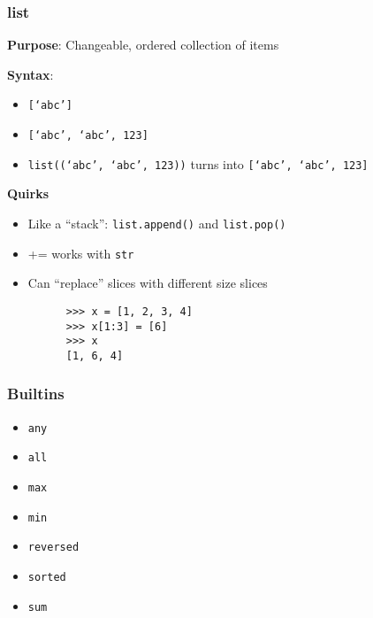 \documentclass{beamer}
\begin{document}
\begin{frame}[fragile]
  \frametitle{list}

   \textbf{Purpose}: Changeable, ordered collection of items

   \textbf{Syntax}: 
   \begin{itemize}
     \item \texttt{[`abc']} 
     \item \texttt{[`abc', `abc', 123]}
     \item \texttt{list((`abc', `abc', 123))} turns into \texttt{[`abc', `abc', 123]}
   \end{itemize}

  \textbf{Quirks}
  \begin{itemize}
    \item Like a ``stack'': \texttt{list.append()} and \texttt{list.pop()}
    \item += works with \texttt{str}
    \item Can ``replace'' slices with different size slices 
    \begin{lstlisting}
      >>> x = [1, 2, 3, 4]
      >>> x[1:3] = [6]
      >>> x
      [1, 6, 4]
    \end{lstlisting}
  \end{itemize}
\end{frame}

\begin{frame}
  \frametitle{Builtins}

  \begin{itemize}
    \item \texttt{any}
    \item \texttt{all}
    \item \texttt{max}
    \item \texttt{min}
    \item \texttt{reversed}
    \item \texttt{sorted}
    \item \texttt{sum}
  \end{itemize}
\end{frame}
\end{document}
